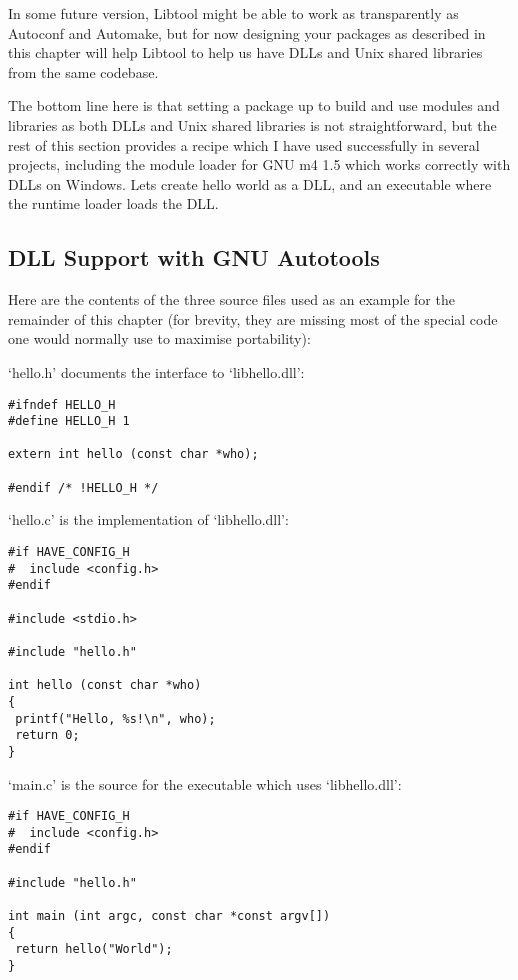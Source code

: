 In some future version, Libtool might be able to work as transparently as Autoconf and Automake, but for now designing your packages as described in this chapter will help Libtool to help us have DLLs and Unix shared libraries from the same codebase.

The bottom line here is that setting a package up to build and use modules and libraries as both DLLs and Unix shared libraries is not straightforward, but the rest of this section provides a recipe which I have used successfully in several projects, including the module loader for GNU m4 1.5 which works correctly with DLLs on Windows. Lets create hello world as a DLL, and an executable where the runtime loader loads the DLL. 

\subsection{DLL Support with GNU Autotools}

Here are the contents of the three source files used as an example for the remainder of this chapter (for brevity, they are missing most of the special code one would normally use to maximise portability):

`hello.h' documents the interface to `libhello.dll':

\begin{Verbatim}[frame=single]
#ifndef HELLO_H
#define HELLO_H 1

extern int hello (const char *who);

#endif /* !HELLO_H */
\end{Verbatim}

`hello.c' is the implementation of `libhello.dll':

\begin{Verbatim}[frame=single]
#if HAVE_CONFIG_H
#  include <config.h>
#endif

#include <stdio.h>

#include "hello.h"

int hello (const char *who)
{
 printf("Hello, %s!\n", who);
 return 0;
}
\end{Verbatim}

`main.c' is the source for the executable which uses `libhello.dll':

\begin{Verbatim}[frame=single]
#if HAVE_CONFIG_H
#  include <config.h>
#endif

#include "hello.h"

int main (int argc, const char *const argv[])
{
 return hello("World");
}
\end{Verbatim}

